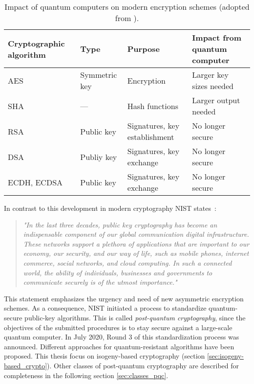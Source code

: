 \begin{table}[H]
  \centering
  \begin{tabular}{|K{3cm}|K{3cm}|K{4cm}|K{4cm}|}
	\hline
      \textbf{Cryptographic} \textbf{algorithm} & \textbf{Type} & \textbf{Purpose} & \textbf{Impact from} \textbf{ quantum computer} \\
	\hline
      \gls{AES} & Symmetric key & Encryption & Larger key sizes needed \\
    \hline
      \gls{SHA} & --- & Hash functions & Larger output needed \\
    \hline
      \gls{RSA} & Public key & Signatures, key establishment & No longer secure \\
	\hline      
      \gls{DSA} & Publiy key & Signatures, key exchange & No longer secure \\
    \hline
      \gls{ECDH}, \gls{ECDSA} & Public key & Signatures, key exchange & No longer secure \\
    \hline
  \end{tabular}
  \caption[Impact of quantum computers on modern encryption schemes]{Impact of quantum computers on modern encryption schemes (adopted from \parencite{chen2016report}).}\label{tab:impact}
\end{table}

In contrast to this development in modern cryptography \gls{NIST} states~\parencite{chen2016report}:
\begin{quote}
\textit{"In the last three decades, public key cryptography has become an indispensable component of our global communication digital infrastructure. These networks support a plethora of applications that are important to our economy, our security, and our way of life, such as mobile phones, internet commerce, social networks, and cloud computing. In such a connected world, the ability of individuals, businesses and governments to communicate securely is of the utmost importance."}
\end{quote}
This statement emphasizes the urgency and need of new asymmetric encryption schemes. As a consequence, \gls{NIST} initiated a process to standardize quantum-secure public-key algorithms. This is called \textit{post-quantum cryptography}, since the objectives of the submitted procedures is to stay secure against a large-scale quantum computer. In July 2020, Round 3 of this standardization process was announced. Different approaches for quantum-resistant algorithms have been proposed. This thesis focus on isogeny-based cryptography (section \ref{sec:isogeny-based_crypto}). Other classes of post-quantum cryptography are described for completeness in the following section \ref{sec:classes_pqc}.

